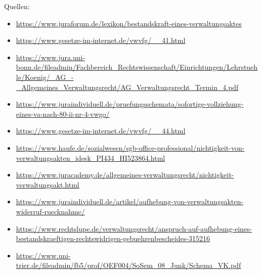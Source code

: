 \documentclass{article}
\begin{document}
		Quellen:
	\begin{itemize}
		\item \url{https://www.juraforum.de/lexikon/bestandskraft-eines-verwaltungsaktes}
		\item \url{https://www.gesetze-im-internet.de/vwvfg/__41.html}
		\item \url{https://www.jura.uni-bonn.de/fileadmin/Fachbereich_Rechtswissenschaft/Einrichtungen/Lehrstuehle/Koenig/_AG_-_Allgemeines_Verwaltungsrecht/AG_Verwaltungsrecht_Termin_4.pdf}
		\item \url{https://www.juraindividuell.de/pruefungsschemata/sofortige-vollziehung-eines-va-nach-80-ii-nr-4-vwgo/}
		\item \url{https://www.gesetze-im-internet.de/vwvfg/__44.html}
		\item \url{https://www.haufe.de/sozialwesen/sgb-office-professional/nichtigkeit-von-verwaltungsakten_idesk_PI434_HI523864.html}
		\item \url{https://www.juracademy.de/allgemeines-verwaltungsrecht/nichtigkeit-verwaltungsakt.html}
		\item \url{https://www.juraindividuell.de/artikel/aufhebung-von-verwaltungsakten-widerruf-ruecknahme/}
		\item \url{https://www.rechtslupe.de/verwaltungsrecht/anspruch-auf-aufhebung-eines-bestandskraeftigen-rechtswidrigen-gebuehrenbescheides-315216}
		\item \url{https://www.uni-trier.de/fileadmin/fb5/prof/OEF004/SoSem_08_Junk/Schema_VK.pdf}
	\end{itemize}
	
\end{document}
